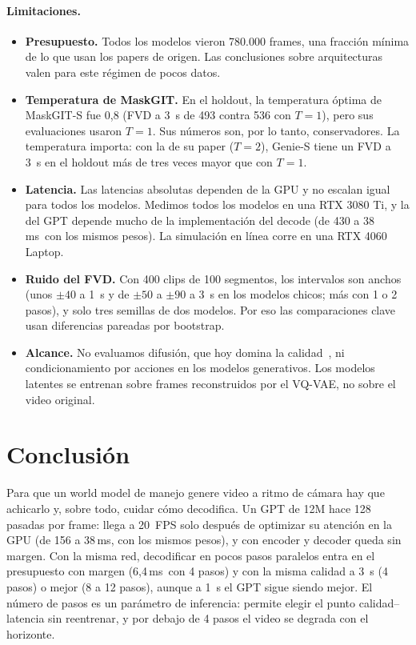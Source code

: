 \documentclass[10pt,twocolumn,a4paper]{article}
\DeclareRobustCommand{\editado}[1]{\textcolor{editado}{#1}}
\DeclareRobustCommand{\editado}[1]{#1}
\newcommand{\ms}{\,ms}
\begin{document}
\paragraph{Limitaciones.}
\begin{itemize}
  \item \textbf{Presupuesto.} Todos los modelos vieron 780.000 frames, una fracción mínima de lo que usan los papers de origen. Las conclusiones sobre arquitecturas valen para este régimen de pocos datos.
  \item \textbf{Temperatura de MaskGIT.} En el holdout, la temperatura óptima de MaskGIT-S fue 0,8 (FVD a 3~s de 493 contra 536 con $T=1$), pero sus evaluaciones usaron $T=1$. Sus números son, por lo tanto, conservadores. La temperatura importa: con la de su paper ($T=2$), Genie-S tiene un FVD a 3~s en el holdout más de tres veces mayor que con $T=1$.
  \item \textbf{Latencia.} Las latencias absolutas dependen de la GPU y no escalan igual para todos los modelos. \editado{Medimos todos los modelos en una RTX 3080 Ti, y la del GPT depende mucho de la implementación del decode (de 430 a 38\ms\ con los mismos pesos). La simulación en línea corre en una RTX 4060 Laptop.}
  \item \textbf{Ruido del FVD.} Con 400 clips de 100 segmentos, los intervalos son anchos (\editado{unos $\pm40$ a 1~s y de $\pm50$ a $\pm90$ a 3~s en los modelos chicos; más con 1 o 2 pasos}), y solo tres semillas de dos modelos. Por eso las comparaciones clave usan diferencias pareadas por bootstrap.
  \item \textbf{Alcance.} No evaluamos difusión, que hoy domina la calidad~\cite{alonso2024diamond,goff2025learning}, ni condicionamiento por acciones en los modelos generativos. Los modelos latentes se entrenan sobre frames reconstruidos por el VQ-VAE, no sobre el video original.
\end{itemize}

\section{Conclusión}

\editado{Para que un world model de manejo genere video a ritmo de cámara hay que achicarlo y, sobre todo, cuidar cómo decodifica. Un GPT de 12M hace 128 pasadas por frame: llega a 20~FPS solo después de optimizar su atención en la GPU (de 156 a 38\ms, con los mismos pesos), y con encoder y decoder queda sin margen. Con la misma red, decodificar en pocos pasos paralelos entra en el presupuesto con margen (6,4\ms\ con 4 pasos) y con la misma calidad a 3~s (4 pasos) o mejor (8 a 12 pasos), aunque a 1~s el GPT sigue siendo mejor. El número de pasos es un parámetro de inferencia: permite elegir el punto calidad--latencia sin reentrenar, y por debajo de 4 pasos el video se degrada con el horizonte.}
\end{document}
